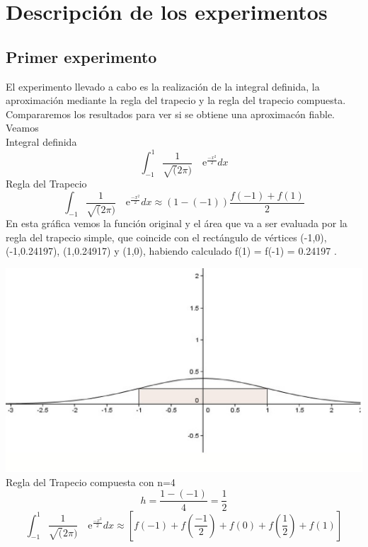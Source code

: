 


\section{Descripción de los experimentos}
\label{3:sec:1}
\parindent=0.5cm
\raggedright
\subsection{Primer experimento}
El experimento llevado a cabo es la realización de la integral definida, la aproximación
mediante la regla del trapecio y la regla del trapecio compuesta. Compararemos los resultados para ver si se obtiene una aproximacón fiable.
 Veamos\\
Integral definida 
\[
\int_{-1}^{1} \frac{1}{\sqrt(2\pi)} \quad\text{e}^{\frac{-x^2}{2}}dx
\]
Regla del Trapecio
\[
\int_{-1}^{} \frac{1}{\sqrt(2\pi)} \quad\text{e}^{\frac{-x^2}{2}}dx\approx\left(1-(-1)\right)\frac{f(-1)+f(1)}{2}
\]
En esta gráfica vemos la función original y el área que va a ser evaluada por la regla del trapecio simple, que coincide con el rectángulo de vértices (-1,0), (-1,0.24197), (1,0.24917)
 y (1,0), habiendo calculado f(1) = f(-1) = 0.24197 .

\includegraphics[width=1.15\textwidth]{images/trasim}
 Regla del Trapecio compuesta con n=4
\[
h=\frac{1-(-1)}{4} =\frac{1}{2} 
\]
\[
\int_{-1}^{1} \frac{1}{\sqrt(2\pi)} \quad\text{e}^{\frac{-x^2}{2}}dx\approx\left[f(-1) + f(\frac{-1}{2}) + f(0) + f(\frac{1}{2}) + f(1)\right]
\]


